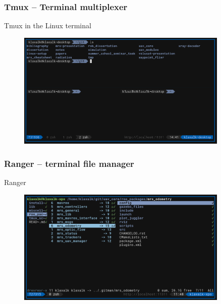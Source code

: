 \documentclass[aspectratio=1610]{beamer}
\begin{document}
  \begin{frame}

    \frametitle{Tmux -- Terminal multiplexer}

    \begin{block}{Tmux in the Linux terminal}
      \begin{figure}
        \includegraphics[width=0.9\textwidth]{fig/tmux.png}
      \end{figure}
    \end{block}

  \end{frame}



  \begin{frame}

    \frametitle{Ranger -- terminal file manager}

    \begin{block}{Ranger}
      \begin{figure}
        \includegraphics[width=0.9\textwidth]{fig/ranger.png}
      \end{figure}
    \end{block}

  \end{frame}
\end{document}
